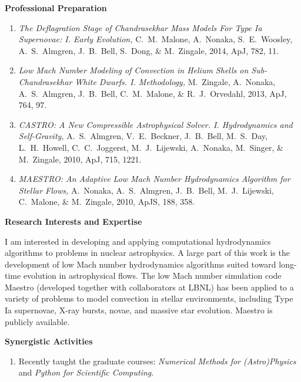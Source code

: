 \documentclass[11pt,letterpaper,english]{article}
\begin{document}
\begin{flushleft} {\bf Professional Preparation}
\begin{enumerate}
\item {\it The Deflagration Stage of Chandrasekhar Mass Models For
  Type Ia Supernovae: I. Early Evolution, } C.~M.~Malone, A.~Nonaka,
  S.~E.~Woosley, A.~S.~Almgren, J.~B.~Bell, S.~Dong, \& M.~Zingale,
  2014, ApJ, 782, 11.

\item {\it Low Mach Number Modeling of Convection in Helium Shells on
  Sub-Chandrasekhar White Dwarfs. I. Methodology,} M.~Zingale,
  A.~Nonaka, A.~S.~Almgren, J.~B.~Bell, C.~M.~Malone, \&
  R.~J.~Orvedahl, 2013, ApJ, 764, 97.

\item {\it CASTRO: A New Compressible Astrophysical
  Solver. I. Hydrodynamics and Self-Gravity,} A.~S.~Almgren,
  V.~E.~Beckner, J.~B.~Bell, M.~S.~Day, L.~H.~Howell, C.~C.~Joggerst,
  M.~J.~Lijewski, A.~Nonaka, M.~Singer, \& M.~Zingale, 2010, ApJ, 715,
  1221.

\item {\it MAESTRO: An Adaptive Low Mach Number Hydrodynamics
  Algorithm for Stellar Flows,} A.~Nonaka, A.~S.~Almgren, J.~B.~Bell,
  M.~J.~Lijewski, C.~Malone, \& M.~Zingale, 2010, ApJS, 188, 358.

\end{enumerate} 

\vspace{-6pt}
{\bf Research Interests and Expertise}
{\parindent 16pt

I am interested in developing and
  applying computational hydrodynamics algorithms to problems in
  nuclear astrophysics.  A large part of this work is the development
  of low Mach number hydrodynamics algorithms suited toward long-time
  evolution in astrophysical flows.  The low Mach number simulation
  code Maestro (developed together with collaborators at LBNL) has
  been applied to a variety of problems to model convection in stellar
  environments, including Type Ia supernovae, X-ray bursts, novae,
  and massive star evolution.  Maestro is publicly available.

}

\vspace{.04in}
{\bf Synergistic Activities}
\vspace{-6pt}
\begin{enumerate} \itemsep1pt \parskip0pt 
\item Recently taught the graduate courses: {\em Numerical Methods for
  (Astro)Physics} and {\em Python for Scientific Computing}. \\


\end{enumerate}
\end{flushleft}
\end{document}
